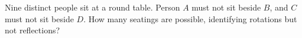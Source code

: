 Nine distinct people sit at a round table. Person $A$ must not sit beside $B$, and $C$ must not sit beside $D$. How many seatings are possible, identifying rotations but not reflections?
